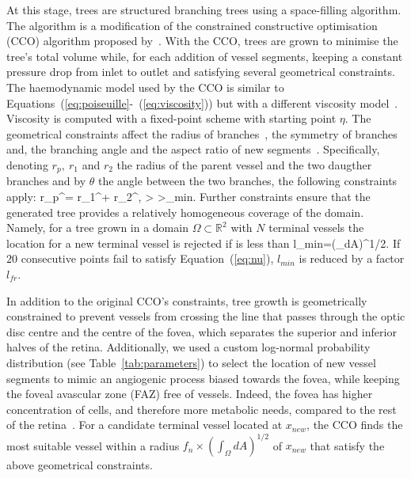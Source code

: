 \documentclass[11pt,]{article}
\let\oldequation\equation
\let\oldendequation\endequation
\renewenvironment{equation}
  {\linenomathNonumbers\oldequation}
  {\oldendequation\endlinenomath}
\begin{document}
At this stage, trees are structured branching trees using a
space-filling algorithm. The algorithm is a modification of the
constrained constructive optimisation (CCO) algorithm proposed
by~\cite{Talou2021}. With the CCO, trees are grown to minimise the tree’s
total volume while, for each addition of vessel segments,
keeping a constant pressure drop from
inlet to outlet and satisfying several geometrical constraints.
The haemodynamic model used by the CCO is similar to Equations~(\ref{eq:poiseuille}-~(\ref{eq:viscosity})) but with a different viscosity model~\cite{Talou2021}.
Viscosity is computed with a fixed-point scheme with starting point $\eta$.
The geometrical constraints affect the radius of branches~\cite{Murray_1926}, the symmetry of branches and, the branching angle and the aspect ratio of new segments~\cite{Talou2021}.
Specifically, denoting $r_p,\ r_1$ and $r_2$ the radius of the parent vessel and the two daugther branches and by $\theta$ the angle between the two branches, the following constraints apply:
\begin{equation}
  \label{eq:CCOradiusconstraints}
  r_p^\gamma = r_1^\gamma + r_2^\gamma, \quad
   > \delta\quad{}\quad
  \theta>\theta_{min}.
\end{equation}
Further constraints ensure that the generated tree provides a relatively homogeneous coverage of the domain.
Namely, for a tree grown in a domain $\Omega\subset\mathbb{R}^2$ with $N$ terminal vessels the location for a new terminal vessel is rejected if is less than
\begin{equation}
  \label{eq:nu}
  l_{min}=\left(\int_\Omega dA\right)^{1/2}.
\end{equation}
If $20$ consecutive points fail to satisfy Equation~(\ref{eq:nu}), $l_{min}$ is reduced by a factor $l_{fr}$.

In addition to the original CCO’s constraints, tree growth is
geometrically constrained to prevent vessels from crossing the line
that passes through the optic disc centre and the centre of the fovea,
which separates the superior and inferior halves of the
retina. Additionally, we used a custom log-normal probability distribution (see Table~\ref{tab:parameters})
to select the location of new vessel segments to mimic an angiogenic
process biased towards the fovea, while keeping the foveal avascular
zone (FAZ) free of vessels. 
Indeed, the fovea has higher concentration
of cells, and therefore more metabolic needs, compared to the rest of
the retina~\cite{Zouache2022}.
For a candidate terminal vessel located at $x_{new}$, the CCO finds the most suitable vessel within a radius $f_n\times\left(\int_\Omega dA\right)^{1/2}$ of $x_{new}$ that satisfy the above geometrical constraints.
\end{document}
